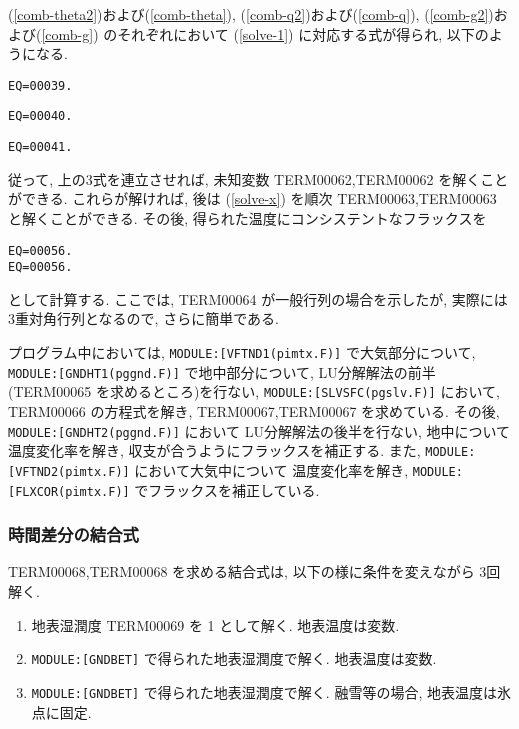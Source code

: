 (\ref{comb-theta2})および(\ref{comb-theta}), 
(\ref{comb-q2})および(\ref{comb-q}), 
(\ref{comb-g2})および(\ref{comb-g})  のそれぞれにおいて
(\ref{solve-1}) に対応する式が得られ, 以下のようになる.

\begin{verbatim}
EQ=00039.
\end{verbatim}
\begin{verbatim}
EQ=00040.
\end{verbatim}
\begin{verbatim}
EQ=00041.
\end{verbatim}

従って, 上の3式を連立させれば,
未知変数 TERM00062,TERM00062 を解くことができる.
これらが解ければ, 後は
(\ref{solve-x}) を順次 TERM00063,TERM00063 と解くことができる.
%
その後, 得られた温度にコンシステントなフラックスを
\begin{verbatim}
EQ=00056.
EQ=00056.
\end{verbatim}
として計算する.
%
ここでは, TERM00064 が一般行列の場合を示したが,
実際には3重対角行列となるので, さらに簡単である.

プログラム中においては,
\texttt{MODULE:[VFTND1(pimtx.F)]} で大気部分について,
\texttt{MODULE:[GNDHT1(pggnd.F)]} で地中部分について, LU分解解法の前半
(TERM00065 を求めるところ)を行ない, 
\texttt{MODULE:[SLVSFC(pgslv.F)]} において, TERM00066 の方程式を解き,
TERM00067,TERM00067 を求めている.
その後, \texttt{MODULE:[GNDHT2(pggnd.F)]} において
LU分解解法の後半を行ない, 地中について温度変化率を解き, 
収支が合うようにフラックスを補正する.
また, \texttt{MODULE:[VFTND2(pimtx.F)]} において大気中について
温度変化率を解き, 
\texttt{MODULE:[FLXCOR(pimtx.F)]} でフラックスを補正している.

\subsubsection{時間差分の結合式}

TERM00068,TERM00068 を求める結合式は, 
以下の様に条件を変えながら 3回解く. 
\begin{enumerate}
\item 地表湿潤度 TERM00069 を 1 として解く. 地表温度は変数. 
\item \texttt{MODULE:[GNDBET]} で得られた地表湿潤度で解く. 
      地表温度は変数.
\item \texttt{MODULE:[GNDBET]} で得られた地表湿潤度で解く. 
      融雪等の場合, 地表温度は氷点に固定. 
\end{enumerate}


